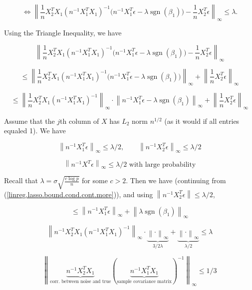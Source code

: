 \[
\iff \left\lVert \frac{1}{n} X_{2}^T X_1 (n^{-1} X_1^TX_1)^{-1} \big( n^{-1} X_1^T \epsilon -  \lambda  \operatorname{sgn}(\beta_1)\big)    -  \frac{1}{n} X_{2}^T \epsilon \right\rVert_\infty \leq \lambda.
\]

Using the Triangle Inequality, we have

\[
\left\lVert \frac{1}{n} X_{2}^T X_1 (n^{-1} X_1^TX_1)^{-1} \big( n^{-1} X_1^T \epsilon -  \lambda  \operatorname{sgn}(\beta_1)\big)    -  \frac{1}{n} X_{2}^T \epsilon \right\rVert_\infty 
\]

\[
\leq \left\lVert \frac{1}{n} X_{2}^T X_1 (n^{-1} X_1^TX_1)^{-1} \big( n^{-1} X_1^T \epsilon -  \lambda  \operatorname{sgn}(\beta_1)\big)  \right\rVert_\infty + \left\lVert  \frac{1}{n} X_{2}^T \epsilon \right\rVert_\infty 
\]

\begin{equation}\label{linreg.lasso.bound.cond.cont.more}
\leq \left\lVert \frac{1}{n} X_{2}^T  X_1 (n^{-1} X_1^TX_1)^{-1} \right\rVert_\infty \cdot \left\lVert  n^{-1} X_1^T \epsilon -  \lambda  \operatorname{sgn}(\beta_1)    \right\rVert_\infty + \left\lVert  \frac{1}{n} X_{2}^T \epsilon \right\rVert_\infty 
\end{equation}

Assume that the \(j\)th column of \(X\) has \(L_2\) norm \(n^{1/2}\) (as it would if all entries equaled 1). We have

\[
\left\lVert n^{-1} X_1^T \epsilon \right\rVert_\infty \leq \lambda/2, \qquad \left\lVert n^{-1} X_2^T \epsilon \right\rVert_\infty \leq \lambda/2
\]

\[
\left\lVert n^{-1} X^T \epsilon \right\rVert_\infty \leq \lambda/2 \text{ with large probability}
\]

Recall that \(\lambda = \sigma \sqrt{ \frac{c \log p }{n} } \) for some \(c >2\). Then we have (continuing from (\ref{linreg.lasso.bound.cond.cont.more})), and using \( \left\lVert n^{-1}X_2^T \epsilon \right\rVert \leq \lambda/2\), 

\[
\leq \left\lVert n^{-1} X_1^T \epsilon \right\rVert_\infty + \left\lVert \lambda \operatorname{sgn}(\beta_1)   \right\rVert_\infty
\]

\[
 \left\lVert n^{-1} X_2^T X_1(n^{-1}X_1^T X_1)^{-1} \right\rVert_\infty \cdot \underbrace{ \left\lVert \cdot \right\rVert_\infty}_{3/2 \lambda} + \underbrace{\left\lVert \cdot \right\rVert_\infty}_{\lambda/2} \leq \lambda
\]

\begin{equation}\label{linreg.lasso.irrep}
 \left\lVert \underbrace{n^{-1} X_2^T X_1}_{\text{corr. between noise and true}}( \underbrace{n^{-1}X_1^T X_1}_{\text{sample covariance matrix}})^{-1} \right\rVert_\infty  \leq 1/3
\end{equation}

